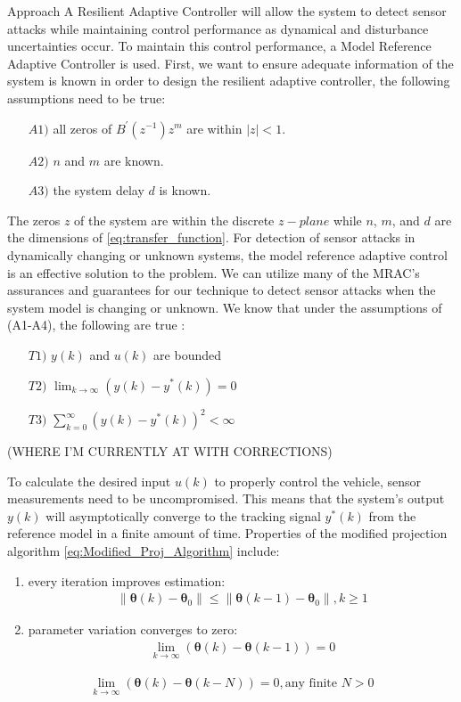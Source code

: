 \begin{section}{Approach}
A Resilient Adaptive Controller will allow the system to detect sensor attacks while maintaining control performance as dynamical and disturbance uncertainties occur. To maintain this control performance, a Model Reference Adaptive Controller is used. First, we want to ensure adequate information of the system is known in order to design the resilient adaptive controller, the following assumptions need to be true:
	\begin{enumerate}[leftmargin=4\parindent]
	\item[$A1)$] all zeros of $B^{'}(z^{-1})z^m$ are within $|z|<1$. 
	\item[$A2)$] $n$ and $m$ are known. 
	\item[$A3)$] the system delay $d$ is known.
	\end{enumerate}
The zeros $z$ of the system are within the discrete $z-plane$ while $n$, $m$, and $d$ are the dimensions of \eqref{eq:transfer_function}. For detection of sensor attacks in dynamically changing or unknown systems, the model reference adaptive control is an effective solution to the problem. We can utilize many of the MRAC's assurances and guarantees for our technique to detect sensor attacks when the system model is changing or unknown. We know that under the assumptions of (A1-A4), the following are true \cite{tao2003adaptive}:
	\begin{enumerate}[label=(\roman*),leftmargin=4\parindent]
	\label{assumtions_ensure}
	\item[$T1)$] $y(k)$ and $u(k)$ are bounded 
	\item[$T2)$] $\lim_{k\to\infty}(y(k)-y^*(k))=0$
	\label{Truth2}
	\item[$T3)$] $\sum_{k=0}^\infty(y(k)-y^*(k))^2<\infty$
	\end{enumerate}
	
	

(WHERE I'M CURRENTLY AT WITH CORRECTIONS)


To calculate the desired input $u(k)$ to properly control the vehicle, sensor measurements need to be uncompromised. 
This means that the system's output $y(k)$ will asymptotically converge to the tracking signal $y^*(k)$ from the reference model in a finite amount of time. Properties of the modified projection algorithm \eqref{eq:Modified_Proj_Algorithm} include:
    \begin{enumerate}[label=(\roman*),leftmargin=4\parindent]
	\item every iteration improves estimation:
	    \begin{align}
	        \|\bm{\theta}(k)-\bm{\theta}_0\|\leq\|\bm{\theta}(k-1)-\bm{\theta}_0\|, k\geq1 \nonumber
	    \end{align}
	\item parameter variation converges to zero:
	    \begin{align}
	        \lim_{k\to\infty}(\bm{\theta}(k)-\bm{\theta}(k-1))=0 \nonumber
	    \end{align}
	\end{enumerate}
	\begin{align}
	   \lim_{k\to\infty}(\bm{\theta}(k)-\bm{\theta}(k-N))=0, \text{any finite } N>0 \nonumber
	\end{align}


\end{section}
